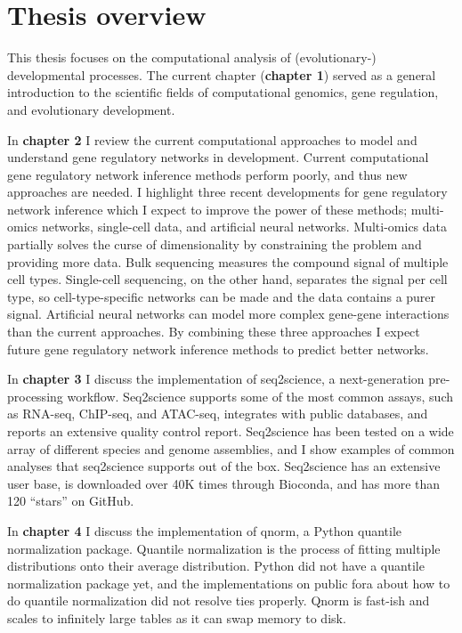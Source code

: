 \section{Thesis overview}

This thesis focuses on the computational analysis of (evolutionary-) developmental processes. The current chapter (\textbf{chapter 1}) served as a general introduction to the scientific fields of computational genomics, gene regulation, and evolutionary development.  

In \textbf{chapter 2} I review the current computational approaches to model and understand gene regulatory networks in development. Current computational gene regulatory network inference methods perform poorly, and thus new approaches are needed. I highlight three recent developments for gene regulatory network inference which I expect to improve the power of these methods; multi-omics networks, single-cell data, and artificial neural networks. Multi-omics data partially solves the curse of dimensionality by constraining the problem and providing more data. Bulk sequencing measures the compound signal of multiple cell types. Single-cell sequencing, on the other hand, separates the signal per cell type, so cell-type-specific networks can be made and the data contains a purer signal. Artificial neural networks can model more complex gene-gene interactions than the current approaches. By combining these three approaches I expect future gene regulatory network inference methods to predict better networks.

In \textbf{chapter 3} I discuss the implementation of seq2science, a next-generation pre-processing workflow. Seq2science supports some of the most common assays, such as RNA-seq, ChIP-seq, and ATAC-seq, integrates with public databases, and reports an extensive quality control report. Seq2science has been tested on a wide array of different species and genome assemblies, and I show examples of common analyses that seq2science supports out of the box. Seq2science has an extensive user base\cite{Bright_2021,Xu_2020,Wester2021,SantosBarriopedro2021,Heuts2023,Tholen2023,Harlaar2022,LunaVelez2023,Neikes2023,Vierboom2021,Smits2020,Smits2022,Heuts2022,Rother2023}, is downloaded over 40K times through Bioconda, and has more than 120 ``stars'' on GitHub.

In \textbf{chapter 4} I discuss the implementation of qnorm, a Python quantile normalization package. Quantile normalization is the process of fitting multiple distributions onto their average distribution. Python did not have a quantile normalization package yet, and the implementations on public fora about how to do quantile normalization did not resolve ties properly. Qnorm is fast-ish and scales to infinitely large tables as it can swap memory to disk.

